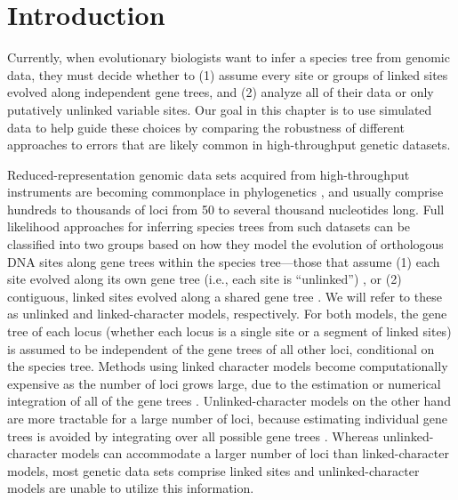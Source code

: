 \section{Introduction}

Currently, when evolutionary biologists want to infer a species tree from
genomic data, they must decide whether to
(1) assume every site or
groups of linked sites evolved along independent gene trees, and
(2) analyze all of their data or only putatively unlinked variable
sites.
Our goal in this chapter is to use simulated data to
help guide these choices by
comparing the robustness of different approaches to
errors that are likely common in high-throughput genetic
datasets.

Reduced-representation genomic data sets acquired from high-throughput
instruments are becoming commonplace in phylogenetics \citep{Leache2017}, and
usually comprise hundreds to thousands of loci from 50 to several thousand
nucleotides long.
Full likelihood approaches
for inferring species trees from such datasets
can be
classified into two groups based on how they model the
evolution of orthologous DNA sites along gene trees within the species
tree---those that assume (1) each site evolved along its own gene tree
(i.e., each site is ``unlinked'')
\citep{bryantInferringSpeciesTrees2012, maioPoMoAlleleFrequencyBased2015},
or (2) contiguous, linked sites evolved along a shared gene tree
\citep{liuSpeciesTreesGene2007, Heled2010, ogilvieStarBEAST2BringsFaster2017,
yangBPPProgramSpecies2015}.
We will refer to these as unlinked and linked-character models, respectively.
For both models, the gene tree of each
locus (whether each locus is a single site or a segment of linked sites)
is assumed to be independent of the gene
trees of all other loci, conditional on the species tree.
Methods using linked character models become computationally expensive as the
number of loci grows large, due to the estimation or numerical integration of
all of the gene trees \citep{bryantInferringSpeciesTrees2012}.
Unlinked-character models on the other
hand are more tractable for a large number of loci, because  estimating
individual gene trees is avoided by integrating over all possible gene trees
\citep{bryantInferringSpeciesTrees2012}.
Whereas unlinked-character models can accommodate a larger number of loci than
linked-character models, most genetic data sets comprise linked sites and
unlinked-character models are unable to utilize this information.

